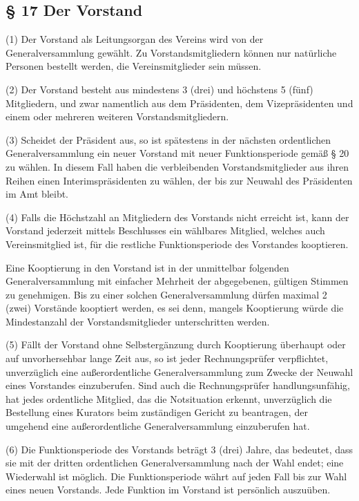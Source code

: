 \documentclass[11pt,a4paper]{article}
\begin{document}
\subsection{§ 17
Der Vorstand}

(1)
Der Vorstand als Leitungsorgan des Vereins wird von der Generalversammlung gewählt.
Zu Vorstandsmitgliedern können nur natürliche Personen bestellt werden, die Vereinsmitglieder sein müssen.

(2)
Der Vorstand besteht aus mindestens 3 (drei) und höchstens 5 (fünf) Mitgliedern, und zwar namentlich aus dem Präsidenten, dem Vizepräsidenten und einem oder mehreren weiteren Vorstandsmitgliedern.

(3)
Scheidet der Präsident aus, so ist spätestens in der nächsten ordentlichen Generalversammlung ein neuer Vorstand mit neuer Funktionsperiode gemäß § 20 zu wählen.
In diesem Fall haben die verbleibenden Vorstandsmitglieder aus ihren Reihen einen Interimspräsidenten zu wählen, der bis zur Neuwahl des Präsidenten im Amt bleibt.

(4)
Falls die Höchstzahl an Mitgliedern des Vorstands nicht erreicht ist, kann der Vorstand jederzeit mittels Beschlusses ein wählbares Mitglied, welches auch Vereinsmitglied ist, für die restliche Funktionsperiode des Vorstandes kooptieren.

Eine Kooptierung in den Vorstand ist in der unmittelbar folgenden Generalversammlung mit einfacher Mehrheit der abgegebenen, gültigen Stimmen zu genehmigen.
Bis zu einer solchen Generalversammlung dürfen maximal 2 (zwei) Vorstände kooptiert werden, es sei denn, mangels Kooptierung würde die Mindestanzahl der Vorstandsmitglieder unterschritten werden.

(5)
Fällt der Vorstand ohne Selbstergänzung durch Kooptierung überhaupt oder auf unvorhersehbar lange Zeit aus, so ist jeder Rechnungsprüfer verpflichtet, unverzüglich eine außerordentliche Generalversammlung zum Zwecke der Neuwahl eines Vorstandes einzuberufen.
Sind auch die Rechnungsprüfer handlungsunfähig, hat jedes ordentliche Mitglied, das die Notsituation erkennt, unverzüglich die Bestellung eines Kurators beim zuständigen Gericht zu beantragen, der umgehend eine außerordentliche Generalversammlung einzuberufen hat.

(6)
Die Funktionsperiode des Vorstands beträgt 3 (drei) Jahre, das bedeutet, dass sie mit der dritten ordentlichen Generalversammlung nach der Wahl endet; eine Wiederwahl ist möglich.
Die Funktionsperiode währt auf jeden Fall bis zur Wahl eines neuen Vorstands.
Jede Funktion im Vorstand ist persönlich auszuüben.
\end{document}
